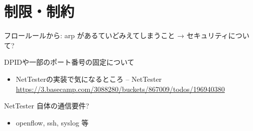 \section{制限・制約}

フロールールから: arp があるていどみえてしまうこと → セキュリティについて?

DPIDや一部のポート番号の固定について
\begin{itemize}
 \item NetTesterの実装で気になるところ – NetTester \url{https://3.basecamp.com/3088280/buckets/867009/todos/196940380}
\end{itemize}

NetTester 自体の通信要件?
\begin{itemize}
 \item openflow, ssh, syslog 等
\end{itemize}


